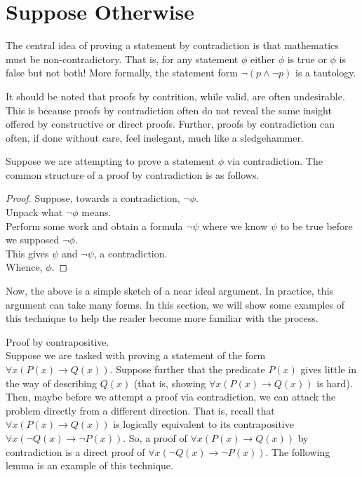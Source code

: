 \section{Suppose Otherwise}



The central idea of proving a statement by contradiction is that mathematics must be non-contradictory.
That is, for any statement $\phi$ either $\phi$ is true or $\phi$ is false but not both!
More formally, the statement form $\neg(p\wedge\neg p)$ is a tautology.

It should be noted that proofs by contrition, while valid, are often undesirable.
This is because proofs by contradiction often do not reveal the same insight offered by constructive or direct proofs.
Further, proofs by contradiction can often, if done without care, feel inelegant, much like a sledgehammer.

Suppose we are attempting to prove a statement $\phi$ via contradiction.
The common structure of a proof by contradiction is as follows.
\begin{proof}
  Suppose, towards a contradiction, $\neg\phi$.\\
  Unpack what $\neg\phi$ means.\\
  Perform some work and obtain a formula $\neg\psi$ where we know $\psi$ to be true before we supposed $\neg\phi$.\\
  This gives $\psi$ and $\neg\psi$, a contradiction.\\
  Whence, $\phi$.
\end{proof}
Now, the above is a simple sketch of a near ideal argument.
In practice, this argument can take many forms.
In this section, we will show some examples of this technique to help the reader become more familiar with the process.








Proof by contrapositive.\\
Suppose we are tasked with proving a statement of the form $\forall x( P(x)\rightarrow Q(x))$.
Suppose further that the predicate $P(x)$ gives little in the way of describing $Q(x)$ (that is, showing $\forall x( P(x)\rightarrow Q(x))$ is hard).
Then, maybe before we attempt a proof via contradiction, we can attack the problem directly from a different direction.
That is, recall that $\forall x( P(x)\rightarrow Q(x))$ is logically equivalent to its contrapositive $\forall x( \neg Q(x)\rightarrow \neg P(x))$.
So, a proof of $\forall x( P(x)\rightarrow Q(x))$ by contradiction is a direct proof of $\forall x( \neg Q(x)\rightarrow \neg P(x))$.
The following lemma is an example of this technique.

